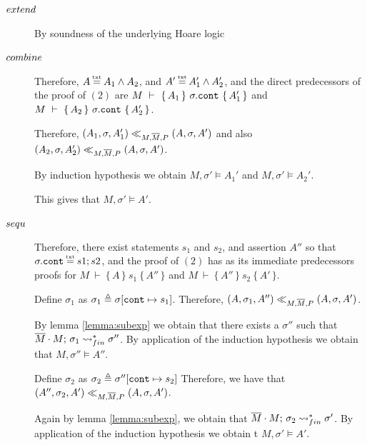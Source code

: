 \begin{description} 

\item[${\sc{extend}}$] 

By soundness of the underlying Hoare logic

\item[${\sc{combine}}$] 

Therefore, $A \txteq A_1 \wedge A_2$,  and $A' \txteq A_1' \wedge A_2'$, and the direct predecessors of the proof of $(2)$
are $M\ \vdash\  \{\, A_1 \,  \}\ \sigma.\prg{cont}\  \{\, A_1' \, \}$ and $M\ \vdash\  \{\, A_2 \,  \}\ \sigma.\prg{cont}\  \{\, A_2' \, \}$. 

Therefore, $(A_1,\sigma,A_1') \ll_{M,\overline{M},P} (A,\sigma,A')$ and also $(A_2,\sigma,A_2') \ll_{M,\overline{M},P} (A,\sigma,A')$. 

By  induction hypothesis we obtain   
$M, \sigma' \models A_1'$ and $M, \sigma' \models A_2'$.

This gives that $M, \sigma' \models A'$.


\item[${\sc{sequ}}$] 

Therefore, there exist statements $s_1$ and $s_2$, and assertion  $A''$ so that $\sigma.\prg{cont}\txteq  s1; s2$, and
the proof of  $(2)$ %
has as its immediate predecessors proofs for 
$M\ \vdash\  \{\, A \,  \}\ s_1\  \{\, A'' \, \}$ and $M\ \vdash\  \{\, A'' \,  \}\  s_2\  \{\, A' \, \}$.

Define $\sigma_1$ as  $\sigma_1 \triangleq \sigma[\mbox{\normalfont{\texttt{cont}}} \mapsto s_1]$.
Therefore,  $(A,\sigma_1,A'') \ll_{M,\overline{M},P} (A,\sigma,A')$. 

By lemma \ref{lemma:subexp} we obtain that there exists a $\sigma''$ such that $\overline{M}\cdot M;\, {\sigma_1} \rightsquigarrow^*_{fin} \sigma''$. 
 By application of the induction hypothesis we obtain that $M, \sigma'' \models A''$.
 
 Define $\sigma_2$ as  $\sigma_2 \triangleq \sigma''[\mbox{\normalfont{\texttt{cont}}} \mapsto s_2]$
Therefore, we have that $(A'',\sigma_2,A') \ll_{M,\overline{M},P} (A,\sigma,A')$. 

 
Again by lemma \ref{lemma:subexp}, we obtain that $\overline{M}\cdot M;\, {\sigma_2} \rightsquigarrow^*_{fin} \sigma'$.  
 By application of the induction hypothesis we obtain t $M, \sigma' \models A'$.


\end{description}
